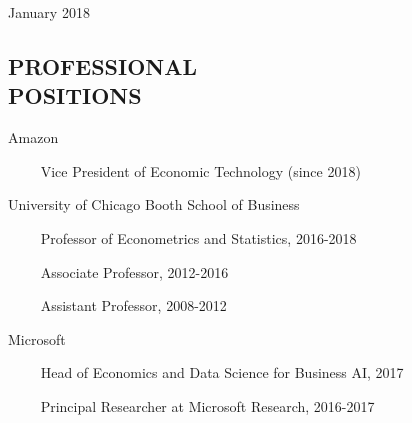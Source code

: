 \documentclass[margin,line]{res}
\begin{document}
\hfill {\sc January 2018}

\begin{resume}

\medskip



\medskip
\section{\bf PROFESSIONAL\\ POSITIONS}

{\sc Amazon}

\vspace{-.4cm}~~~~ Vice President of Economic Technology (since 2018)


\vspace{-.275cm}

{\sc University of Chicago Booth School of Business}

\vspace{-.4cm}~~~~ Professor of Econometrics and Statistics, 2016-2018 

\vspace{-.4cm}~~~~ Associate Professor, 2012-2016


\vspace{-.4cm} ~~~~ Assistant Professor,  2008-2012


\vspace{-.275cm}
{\sc Microsoft}

\vspace{-.4cm}~~~~ Head of Economics and Data Science for Business AI, 2017

\vspace{-.4cm}~~~~ Principal Researcher at Microsoft Research, 2016-2017



\end{resume}
\end{document}
